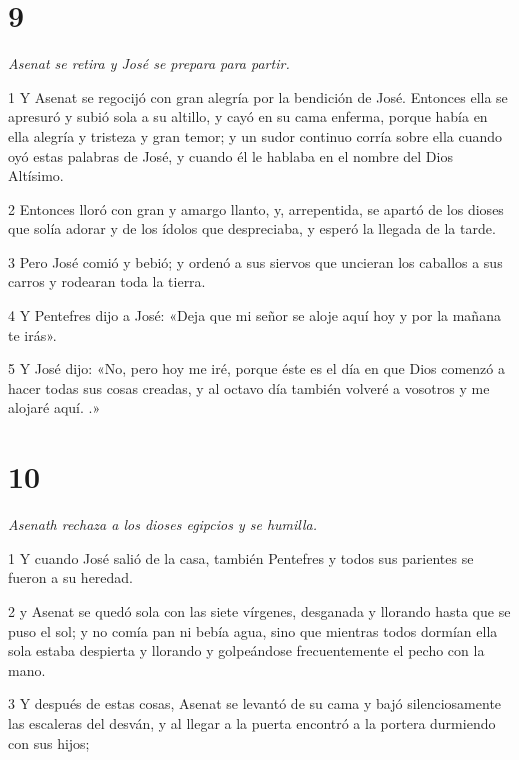 \chapter{9}

\par \textit{Asenat se retira y José se prepara para partir.}

\par 1 Y Asenat se regocijó con gran alegría por la bendición de José. Entonces ella se apresuró y subió sola a su altillo, y cayó en su cama enferma, porque había en ella alegría y tristeza y gran temor; y un sudor continuo corría sobre ella cuando oyó estas palabras de José, y cuando él le hablaba en el nombre del Dios Altísimo.

\par 2 Entonces lloró con gran y amargo llanto, y, arrepentida, se apartó de los dioses que solía adorar y de los ídolos que despreciaba, y esperó la llegada de la tarde.

\par 3 Pero José comió y bebió; y ordenó a sus siervos que uncieran los caballos a sus carros y rodearan toda la tierra.

\par 4 Y Pentefres dijo a José: «Deja que mi señor se aloje aquí hoy y por la mañana te irás».

\par 5 Y José dijo: «No, pero hoy me iré, porque éste es el día en que Dios comenzó a hacer todas sus cosas creadas, y al octavo día también volveré a vosotros y me alojaré aquí. .»

\chapter{10}

\par \textit{Asenath rechaza a los dioses egipcios y se humilla.}

\par 1 Y cuando José salió de la casa, también Pentefres y todos sus parientes se fueron a su heredad.

\par 2 y Asenat se quedó sola con las siete vírgenes, desganada y llorando hasta que se puso el sol; y no comía pan ni bebía agua, sino que mientras todos dormían ella sola estaba despierta y llorando y golpeándose frecuentemente el pecho con la mano.

\par 3 Y después de estas cosas, Asenat se levantó de su cama y bajó silenciosamente las escaleras del desván, y al llegar a la puerta encontró a la portera durmiendo con sus hijos;

